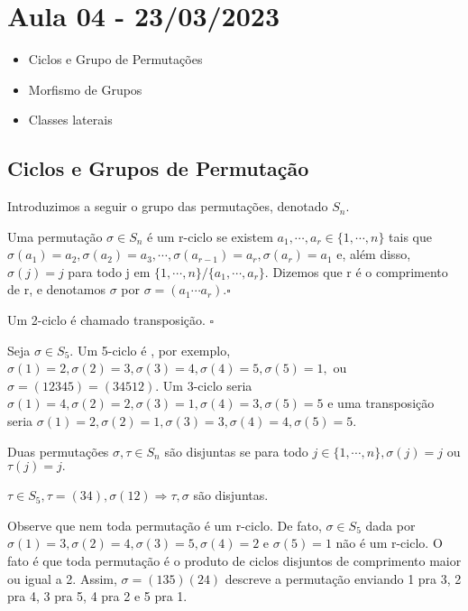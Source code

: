 \documentclass[Algebra/algebra_notes.tex]{subfiles}
\begin{document}
\section{Aula 04 - 23/03/2023}
\begin{itemize}
	\item Ciclos e Grupo de Permutações
	\item Morfismo de Grupos
	\item Classes laterais
\end{itemize}
\subsection{Ciclos e Grupos de Permutação}
Introduzimos a seguir o grupo das permutações, denotado $S_{n}.$
\begin{def*}
	Uma permutação $\sigma\in S_{n}$ é um r-ciclo se existem $a_{1},\cdots, a_{r}\in\{1,\cdots, n\}$ tais que $\sigma(a_{1})=a_{2},
		\sigma(a_{2})=a_{3}, \cdots, \sigma(a_{r-1})=a_{r}, \sigma(a_{r}) = a_{1}$ e, além disso, $\sigma(j) = j$ para todo j em $\{1,\cdots, n\}/\{a_{1},\cdots,a_{r}\}$.
	Dizemos que r é o comprimento de r, e denotamos $\sigma$ por $\sigma=(a_{1}\cdots a_{r}).\square$
\end{def*}
\begin{def*}
	Um 2-ciclo é chamado transposição. $\square$
\end{def*}
\begin{example*}
	Seja $\sigma\in S_{5}.$ Um 5-ciclo é , por exemplo, $\sigma(1)=2, \sigma(2)=3, \sigma(3)=4, \sigma(4)=5, \sigma(5)=1,$ ou $\sigma=(12345)=(34512).$
	Um 3-ciclo seria $\sigma(1)=4, \sigma(2)=2, \sigma(3)=1, \sigma(4)=3, \sigma(5)=5$ e uma transposição seria $\sigma(1)=2, \sigma(2)=1, \sigma(3)=3, \sigma(4)=4, \sigma(5)=5.$
\end{example*}
\begin{def*}
	Duas permutações $\sigma, \tau\in S_{n}$ são disjuntas se para todo $j\in\{1, \cdots, n\}, \sigma(j) = j$ ou $\tau(j) = j.$
\end{def*}
\begin{example*}
	$\tau\in S_{5}, \tau=(34), \sigma(12) \Rightarrow \tau, \sigma$ são disjuntas.
\end{example*}
Observe que nem toda permutação é um r-ciclo. De fato, $\sigma\in S_{5}$ dada por $\sigma(1)=3, \sigma(2) = 4, \sigma(3) = 5, \sigma(4) = 2$
e $\sigma(5)=1$ não é um r-ciclo. O fato é que toda permutação é o produto de ciclos disjuntos de comprimento maior ou igual a 2.
Assim, $\sigma = (135)(24)$ descreve a permutação enviando 1 pra 3, 2 pra 4, 3 pra 5, 4 pra 2 e 5 pra 1.
\end{document}

